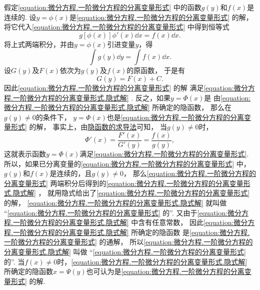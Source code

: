 假定\cref{equation:微分方程.一阶微分方程的分离变量形式} 中的函数\(g(y)\)和\(f(x)\)是连续的.
设\(y=\phi(x)\)是\cref{equation:微分方程.一阶微分方程的分离变量形式} 的解，
将它代入\cref{equation:微分方程.一阶微分方程的分离变量形式} 中得到恒等式\[
	g[\phi(x)] \phi'(x) \dd{x} = f(x) \dd{x}.
\]
将上式两端积分，并由\(y=\phi(x)\)引进变量\(y\)，得\[
	\int g(y) \dd{y} = \int f(x) \dd{x}.
\]
设\(G(y)\)及\(F(x)\)依次为\(g(y)\)及\(f(x)\)的原函数，
于是有\begin{equation}\label{equation:微分方程.一阶微分方程的分离变量形式.隐式解}
	G(y) = F(x) + C.
\end{equation}
因此\cref{equation:微分方程.一阶微分方程的分离变量形式} 的解
满足\cref{equation:微分方程.一阶微分方程的分离变量形式.隐式解} .
反之，如果\(y = \Phi(x)\)是
由\cref{equation:微分方程.一阶微分方程的分离变量形式.隐式解} 所确定的隐函数，
那么在\(g(y)\neq0\)的条件下，
\(y=\Phi(x)\)也是\cref{equation:微分方程.一阶微分方程的分离变量形式} 的解，
事实上，由\hyperref[theorem:多元函数微分法.隐函数存在定理1]{隐函数的求导法}可知，
当\(g(y)\neq0\)时，\[
	\Phi'(x) = \frac{F'(x)}{G'(y)} = \frac{f(x)}{g(y)},
\]
这就表示函数\(y = \Phi(x)\)满足\cref{equation:微分方程.一阶微分方程的分离变量形式}.
所以，如果已分离变量的\cref{equation:微分方程.一阶微分方程的分离变量形式} 中，
\(g(y)\)和\(f(x)\)是连续的，且\(g(y)\neq0\)，
那么\cref{equation:微分方程.一阶微分方程的分离变量形式}
两端积分后得到的\cref{equation:微分方程.一阶微分方程的分离变量形式.隐式解} ，
就用隐式给出了\cref{equation:微分方程.一阶微分方程的分离变量形式} 的解，
\cref{equation:微分方程.一阶微分方程的分离变量形式.隐式解} 就叫做
“\cref{equation:微分方程.一阶微分方程的分离变量形式} 的”.
又由于\cref{equation:微分方程.一阶微分方程的分离变量形式.隐式解} 中含有任意常数，
因此\cref{equation:微分方程.一阶微分方程的分离变量形式.隐式解} 所确定的隐函数
是\cref{equation:微分方程.一阶微分方程的分离变量形式} 的通解，
所以\cref{equation:微分方程.一阶微分方程的分离变量形式.隐式解} 叫做
“\cref{equation:微分方程.一阶微分方程的分离变量形式} 的”.
当\(f(x)\neq0\)时，\cref{equation:微分方程.一阶微分方程的分离变量形式.隐式解}
所确定的隐函数\(x=\Psi(y)\)也可认为是\cref{equation:微分方程.一阶微分方程的分离变量形式} 的解.

